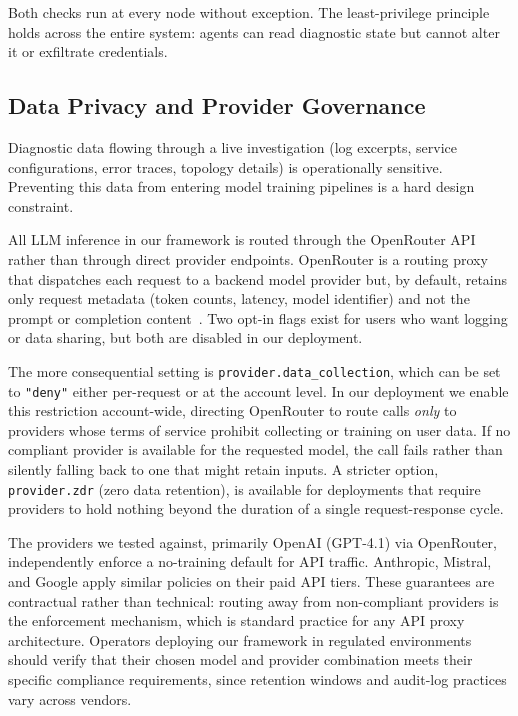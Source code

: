 \documentclass[conference]{IEEEtran}
\begin{document}
Both checks run at every node without exception. The least-privilege
principle~\cite{kholkar2025safeops} holds across the entire system:
agents can read diagnostic state but cannot alter it or exfiltrate
credentials.

\subsection{Data Privacy and Provider Governance}

Diagnostic data flowing through a live investigation (log excerpts,
service configurations, error traces, topology details) is operationally
sensitive. Preventing this data from
entering model training pipelines is a hard design constraint.

All LLM inference in our framework is routed through the OpenRouter
API rather than through direct provider endpoints. OpenRouter is a
routing proxy that dispatches each request to a backend model provider
but, by default, retains only request metadata (token counts, latency,
model identifier) and not the prompt or completion
content~\cite{openrouter2025privacy}. Two opt-in flags exist for
users who want logging or data sharing, but both are disabled in our
deployment.

The more consequential setting is \texttt{provider.data\_collection},
which can be set to \texttt{"deny"} either per-request or at the
account level. In our deployment we enable this restriction
account-wide, directing OpenRouter to route calls \emph{only} to
providers whose terms of service prohibit collecting or training
on user data. If no
compliant provider is available for the requested model, the call
fails rather than silently falling back to one that might retain
inputs. A stricter option, \texttt{provider.zdr} (zero data
retention), is available for deployments that require providers to hold
nothing beyond the duration of a single request-response cycle.

The providers we tested against, primarily OpenAI (GPT-4.1) via
OpenRouter, independently enforce a no-training default for API
traffic. Anthropic, Mistral, and Google apply similar policies on
their paid API tiers. These guarantees are contractual rather than
technical: routing away from non-compliant providers is the
enforcement mechanism, which is standard practice for any API proxy
architecture. Operators deploying our framework in regulated
environments should verify that their chosen model and provider
combination meets their specific compliance requirements, since
retention windows and audit-log practices vary across vendors.
\end{document}
